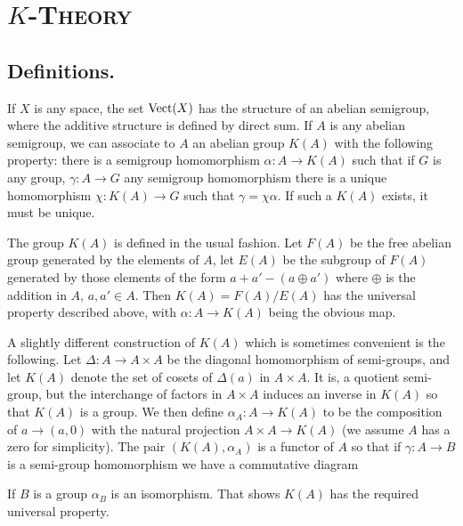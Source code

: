 \chapter{\scshape $K$-Theory}

\section{Definitions.}\label{sec:2.1} If $X$ is any space, the set $\operatorname{Vect}(X)$ has the structure of an abelian semigroup, where the additive structure is defined by direct sum. If $A$ is any abelian semigroup, we can associate to $A$ an abelian group $K(A)$ with the following property: there is a semigroup homomorphism $\alpha: A \to K(A)$ such that if $G$ is any group, $\gamma: A \to G$ any semigroup homomorphism there is a unique homomorphism $\chi: K(A) \to G$ such that $\gamma = \chi \alpha$. If such a $K(A)$ exists, it must be unique. \par

The group $K(A)$ is defined in the usual fashion. Let $F(A)$ be the free abelian group generated by the elements of $A$, let $E(A)$ be the subgroup of $F(A)$ generated by those elements of the form $a+a' - (a \oplus a')$ where $\oplus$ is the addition in $A$, $a, a' \in A$. Then $K(A) = F(A)/E(A)$ has the universal property described above, with $\alpha: A \to K(A)$ being the obvious map. \par

A slightly different construction of $K(A)$ which is sometimes convenient is the following. Let $\Delta: A \to A \times A$ be the diagonal homomorphism of semi-groups, and let $K(A)$ denote the set of cosets of $\Delta(a)$ in  $A \times A$. It is, a quotient semi-group, but the interchange of factors in $A \times A$ induces an inverse in $K(A)$ so that $K(A)$ is a group. We then define $\alpha_A: A \to K(A)$ to be the composition of $a \to (a, 0)$ with the natural projection $A \times A \to K(A)$ (we assume $A$ has a zero for simplicity). The pair $(K(A), \alpha_A)$ is a functor of $A$ so that if $\gamma: A \to B$ is a semi-group homomorphism we have a commutative diagram
\begin{center}
\end{center}
If $B$ is a group $\alpha_B$ is an isomorphism. That shows $K(A)$ has the required universal property. \par 

